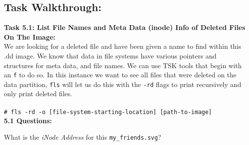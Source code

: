 \documentclass[a4paper,11pt]{article}
\begin{document}
\subsection*{Task Walkthrough:}
{\noindent
\textbf{Task 5.1: List File Names and Meta Data (inode) Info of Deleted Files On The Image:}\\
We are looking for a deleted file and have been given a name to find within this .dd image. We know that data in file systems have various pointers and structures for meta data, and file names. We can use TSK tools that begin with an \texttt{f} to do so. In this instance we want to see all files that were deleted on the data partition, \texttt{fls} will let us do this with the \texttt{-rd} flags to print recursively and only print deleted files.\\
\\
\verb|# fls -rd -o [file-system-starting-location] [path-to-image]|\\

\noindent
\textbf{5.1 Questions:}
\begin{enumerate*}
	\item What is the \textit{iNode Address} for this \texttt{my\_friends.svg}?\\
\end{enumerate*}
}
\end{document}
